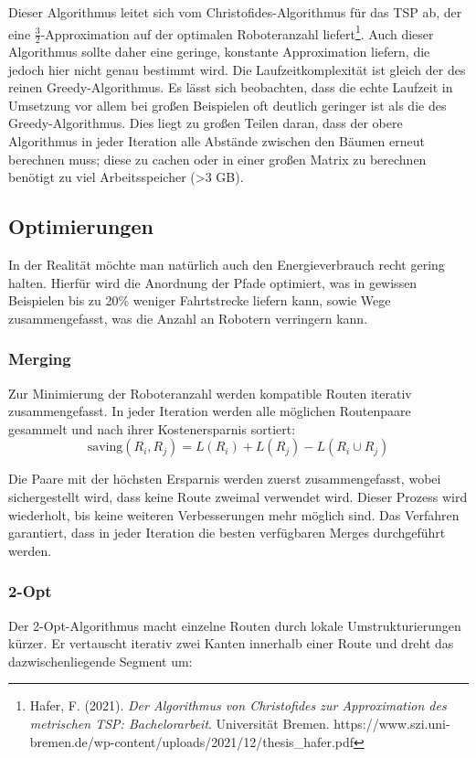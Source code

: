 \documentclass[a4paper,10pt,ngerman]{scrartcl}
\begin{document}
    Dieser Algorithmus leitet sich vom Christofides-Algorithmus für das TSP ab, der eine $\frac{3}{2}$-Approximation auf
    der optimalen Roboteranzahl liefert\footnote{
        Hafer, F. (2021). \textit{Der Algorithmus von Christofides zur Approximation des metrischen TSP:
        Bachelorarbeit}. Universität Bremen. https://www.szi.uni-bremen.de/wp-content/uploads/2021/12/thesis\_hafer.pdf
    }. Auch dieser Algorithmus sollte daher eine geringe, konstante Approximation liefern, die jedoch hier nicht genau
    bestimmt wird. Die Laufzeitkomplexität ist gleich der des reinen Greedy-Algorithmus.
    Es lässt sich beobachten, dass die echte Laufzeit in Umsetzung vor allem bei großen Beispielen oft deutlich geringer
    ist als die des Greedy-Algorithmus. Dies liegt zu großen Teilen daran, dass der obere Algorithmus in jeder Iteration
    alle Abstände zwischen den Bäumen erneut berechnen muss; diese zu cachen oder in einer großen Matrix zu berechnen
    benötigt zu viel Arbeitsspeicher (>3 GB).

    \subsection{Optimierungen}
    In der Realität möchte man natürlich auch den Energieverbrauch recht gering halten. Hierfür wird die Anordnung der
    Pfade optimiert, was in gewissen Beispielen bis zu 20\% weniger Fahrtstrecke liefern kann, sowie Wege
    zusammengefasst, was die Anzahl an Robotern verringern kann.

    \subsubsection{Merging}
    Zur Minimierung der Roboteranzahl werden kompatible Routen iterativ zusammengefasst. In jeder Iteration werden
    alle möglichen Routenpaare gesammelt und nach ihrer Kostenersparnis sortiert:
    \[
        \text{saving}(R_i, R_j) = L(R_i) + L(R_j) - L(R_i \cup R_j)
    \]

    Die Paare mit der höchsten Ersparnis werden zuerst zusammengefasst, wobei sichergestellt wird, dass keine Route
    zweimal verwendet wird. Dieser Prozess wird wiederholt, bis keine weiteren Verbesserungen mehr möglich sind.
    Das Verfahren garantiert, dass in jeder Iteration die besten verfügbaren Merges durchgeführt werden.

    \subsubsection{2-Opt}
    Der 2-Opt-Algorithmus macht einzelne Routen durch lokale Umstrukturierungen kürzer. Er vertauscht iterativ zwei
    Kanten innerhalb einer Route und dreht das dazwischenliegende Segment um:
\end{document}
